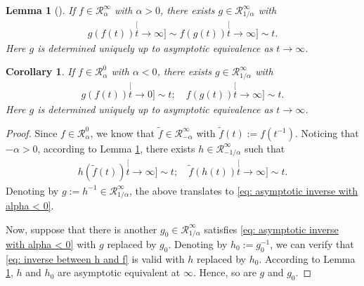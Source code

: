 \documentclass[12pt,a4paper]{amsart}
\newtheorem{lem}[thm]{Lemma}
\newtheorem{cro}[thm]{Corollary}
\theoremstyle{definition}
\numberwithin{equation}{section}
\begin{document}
\begin{lem}[{\cite[Theorem 1.5.12]{BinghamGoldieTeugels1989Regular}}] \label{lem: regularly variation and inverse}
	If $f \in \mathcal R_\alpha^\infty$ with $\alpha > 0$, there exists $g \in \mathcal R^\infty_{1/\alpha}$ with
  \begin{align}
    g(f(t))
    \stackrel[t\to \infty]{}{\sim}
    f(g(t))
    \stackrel[t\to \infty]{}{\sim}
    t.
  \end{align}
	Here $g$ is determined uniquely up to asymptotic equivalence as $t\to \infty$.
\end{lem}
\begin{cro} \label{cro: regularly varing and inverse with alpha < 0}
	If $f \in \mathcal R_\alpha^0$ with $\alpha < 0$, there exists $g \in \mathcal R^\infty_{1/\alpha}$ with
  \begin{align} \label{eq: asymptotic inverse with alpha < 0}
    g(f(t))
    \stackrel[t\to 0]{}{\sim}
    t;
    \quad
    f(g(t))
    \stackrel[t\to \infty]{}{\sim}
    t.
  \end{align}
	Here $g$ is determined uniquely up to asymptotic equivalence as $t\to \infty$.
\end{cro}
\begin{proof}
	Since $f \in \mathcal R_\alpha^0$, we know that $\tilde f \in \mathcal R_{-\alpha}^\infty$ with $\tilde f(t):= f(t^{-1})$.
	Noticing that $-\alpha > 0$, according to Lemma \ref{lem: regularly variation and inverse}, there exists $h \in \mathcal R_{-1/\alpha}^{\infty}$ such that
  \begin{align} \label{eq: inverse between h and f}
    h(\tilde f(t))
    \stackrel[t\to \infty]{}{\sim}
    t;
    \quad
    \tilde f(h(t))
    \stackrel[t\to \infty]{}{\sim}
    t.
  \end{align}
	Denoting by $g := h^{-1} \in \mathcal R_{1/\alpha}^\infty$, the above translates to \eqref{eq: asymptotic inverse with alpha < 0}.

	Now, suppose that there is another $g_0 \in \mathcal R_{1/\alpha}^\infty$ satisfies \eqref{eq: asymptotic inverse with alpha < 0} with $g$ replaced by $g_0$.
	Denoting by $h_0 := g_0^{-1}$, we can verify that \eqref{eq: inverse between h and f} is valid with $h$ replaced by $h_0$.
	According to Lemma \ref{lem: regularly variation and inverse}, $h$ and $h_0$ are asymptotic equivalent at $\infty$.
	Hence, so are $g$ and $g_0$.
\end{proof}
\end{document}
